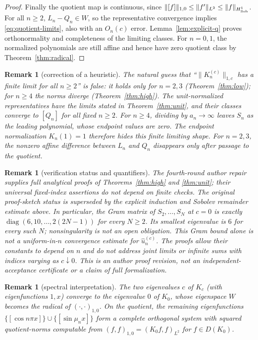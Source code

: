 ﻿\documentclass[11pt]{article}
\newtheorem{remark}[theorem]{Remark}
\begin{document}
\begin{proof}
	Finally the quotient map is continuous, since
	$\|[f]\|_{1,0}\le\|f'\|_{L^2}\le\|f\|_{H^1_{\rm Sob}}$.
	For all $n\ge2$, $L_n-Q_n\in W$, so the representative convergence
	implies \eqref{eq:quotient-limits}, also with an $O_n(c)$ error.
	Lemma~\ref{lem:explicit-q} proves orthonormality and completeness of
	the limiting classes.  For $n=0,1$, the normalized polynomials are
	still affine and hence have zero quotient class by
	Theorem~\ref{thm:radical}.
\end{proof}

\begin{remark}[correction of a heuristic]
	The natural guess that ``$\|K_n^{(c)}\|_{1,c}$ has a finite limit for all
	$n\ge 2$'' is \emph{false}: it holds only for $n=2,3$
	(Theorem~\ref{thm:low}); for $n\ge 4$ the norms diverge
	(Theorem~\ref{thm:high}).  The unit-normalized representatives have
	the limits stated in Theorem~\ref{thm:unit}, and their classes converge
	to $[Q_n]$ for all fixed $n\ge2$.  For $n\ge4$, dividing by
	$a_n\to\infty$ leaves $S_n$ as the leading polynomial, whose endpoint
	values are zero.  The endpoint normalization $K_n(1)=1$ therefore hides
	this finite limiting shape.  For $n=2,3$, the nonzero affine difference
	between $L_n$ and $Q_n$ disappears only after passage to the quotient.
\end{remark}

\begin{remark}[verification status and quantifiers]
	The fourth-round author repair supplies full analytical proofs of
	Theorems~\ref{thm:high} and \ref{thm:unit}; their universal
	fixed-index assertions do not depend on finite checks.  The original
	proof-sketch status is superseded by the explicit induction and
	Sobolev remainder estimate above.  In particular, the Gram matrix
	of $S_2,\ldots,S_N$ at $c=0$ is exactly
	$\operatorname{diag}(6,10,\ldots,2(2N-1))$ for every $N\ge2$.
	Its smallest eigenvalue is $6$ for every such $N$; nonsingularity
	is not an open obligation.  This Gram bound alone is not a
	uniform-in-$n$ convergence estimate for $\widehat u_n^{(c)}$.
	The proofs allow their constants to depend on $n$ and do not address
	joint limits or infinite sums with indices varying as $c\downarrow0$.
	This is an author proof revision, not an independent-acceptance
	certificate or a claim of full formalization.
\end{remark}

\begin{remark}[spectral interpretation]
	The two eigenvalues $c$ of $K_c$ (with eigenfunctions $1,x$) converge to
	the eigenvalue $0$ of $K_0$, whose eigenspace $W$ becomes the radical of
	$(\cdot,\cdot)_{1,0}$.  On the quotient, the remaining eigenfunctions
	$\{[\cos n\pi x]\}\cup\{[\sin\mu_n x]\}$ form a complete orthogonal system
	with squared quotient-norms computable from
	$(f,f)_{1,0}=(K_0f,f)_{L^2}$ for $f\in D(K_0)$.
\end{remark}
\end{document}
